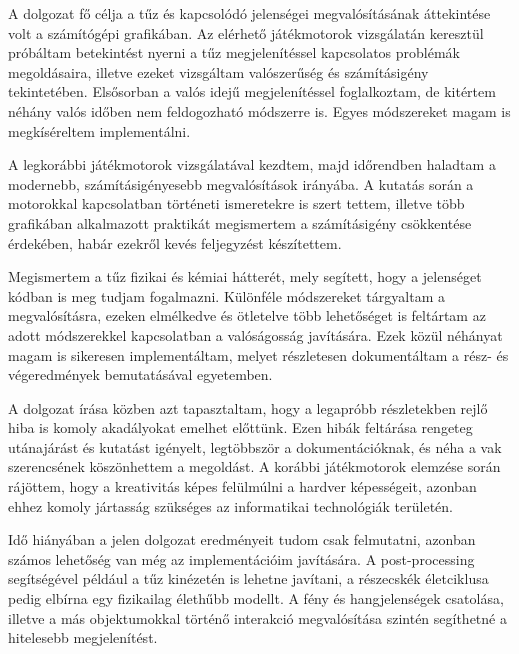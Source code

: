 
A dolgozat fő célja a tűz és kapcsolódó jelenségei megvalósításának áttekintése volt a számítógépi grafikában. Az elérhető játékmotorok vizsgálatán keresztül próbáltam betekintést nyerni a tűz megjelenítéssel kapcsolatos problémák megoldásaira, illetve ezeket vizsgáltam valószerűség és számításigény tekintetében. Elsősorban a valós idejű megjelenítéssel foglalkoztam, de kitértem néhány valós időben nem feldogozható módszerre is. Egyes módszereket magam is megkíséreltem implementálni.

A legkorábbi játékmotorok vizsgálatával kezdtem, majd időrendben haladtam a modernebb, számításigényesebb megvalósítások irányába. A kutatás során a motorokkal kapcsolatban történeti ismeretekre is szert tettem, illetve több grafikában alkalmazott praktikát megismertem a számításigény csökkentése érdekében, habár ezekről kevés feljegyzést készítettem. 

Megismertem a tűz fizikai és kémiai hátterét, mely segített, hogy a jelenséget kódban is meg tudjam fogalmazni. Különféle módszereket tárgyaltam a megvalósításra, ezeken elmélkedve és ötletelve több lehetőséget is feltártam az adott módszerekkel kapcsolatban a valóságosság javítására. 
Ezek közül néhányat magam is sikeresen implementáltam, melyet részletesen dokumentáltam a rész- és végeredmények bemutatásával egyetemben. 

A dolgozat írása közben azt tapasztaltam, hogy a legapróbb részletekben rejlő hiba is komoly akadályokat emelhet előttünk. Ezen hibák feltárása rengeteg utánajárást és kutatást igényelt, legtöbbször a dokumentációknak, és néha a vak szerencsének köszönhettem a megoldást. A korábbi játékmotorok elemzése során rájöttem, hogy a kreativitás képes felülmúlni a hardver képességeit, azonban ehhez komoly jártasság szükséges az informatikai technológiák területén. 


Idő hiányában a jelen dolgozat eredményeit tudom csak felmutatni, azonban számos lehetőség van még az implementációim javítására. A post-processing segítségével például a tűz kinézetén is lehetne javítani, a részecskék életciklusa pedig elbírna egy fizikailag élethűbb modellt. A fény és hangjelenségek csatolása, illetve a más objektumokkal történő interakció megvalósítása szintén segíthetné a hitelesebb megjelenítést. 

